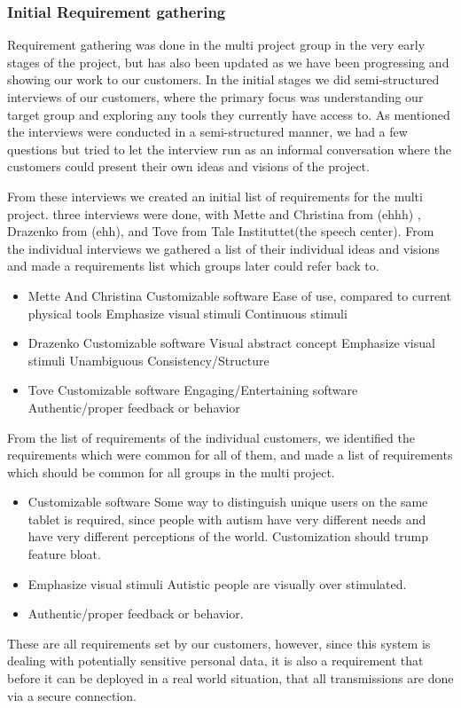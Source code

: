 \subsubsection{Initial Requirement gathering}
Requirement gathering was done in the multi project group in the very early stages of the project, but has also been updated as we have been progressing and showing our work to our customers.
In the initial stages we did semi-structured interviews of our customers, where the primary focus was understanding our target group and exploring any tools they currently have access to.
As mentioned the interviews were conducted in a semi-structured manner, we had a few questions%
but tried to let the interview run as an informal conversation where the customers could present their own ideas and visions of the project.

From these interviews we created an initial list of requirements for the multi project.
three interviews were done, with Mette and Christina from (ehhh) , Drazenko from (ehh), and Tove from Tale Instituttet(the speech center).
From the individual interviews we gathered a list of their individual ideas and visions and made a requirements list which groups later could refer back to.

\begin{itemize}
 \item Mette And Christina 
  \subitem Customizable software
  \subitem Ease of use, compared to current physical tools
  \subitem Emphasize visual stimuli
  \subitem Continuous stimuli 
 \item Drazenko
  \subitem Customizable software
  \subitem Visual abstract concept
  \subitem Emphasize visual stimuli
  \subitem Unambiguous
  \subitem Consistency/Structure
 \item Tove 
  \subitem Customizable software
  \subitem Engaging/Entertaining software
  \subitem Authentic/proper feedback or behavior
\end{itemize}

From the list of requirements of the individual customers, we identified the requirements which were common for all of them, and made a list of requirements which
should be common for all groups in the multi project.

\begin{itemize}
 \item Customizable software
  \subitem Some way to distinguish unique users on the same tablet is required, since people with autism have very different needs and have very different perceptions of the world.
  \subitem Customization should trump feature bloat.
 \item Emphasize visual stimuli
  \subitem Autistic people are visually over stimulated.
 \item Authentic/proper feedback or behavior.
\end{itemize}

These are all requirements set by our customers, however, since this system is dealing with potentially sensitive personal data, it is 
also a requirement that before it can be deployed in a real world situation, that all transmissions are done via a secure connection.